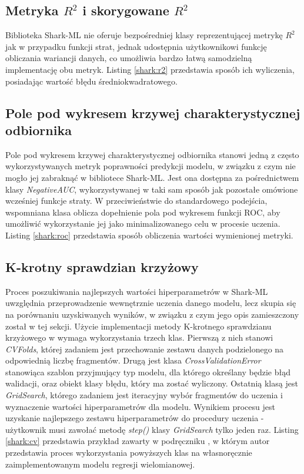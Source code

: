 \subsection{Metryka $R^2$ i skorygowane $R^2$}

Biblioteka Shark-ML nie oferuje bezpośredniej klasy reprezentującej metrykę $R^2$ jak w przypadku funkcji strat, jednak udostępnia użytkownikowi funkcję obliczania wariancji danych, co umożliwia bardzo łatwą samodzielną implementację obu metryk. Listing \ref{shark:r2} przedstawia sposób ich wyliczenia, posiadając wartość błędu średniokwadratowego.


\subsection{Pole pod wykresem krzywej charakterystycznej odbiornika}

Pole pod wykresem krzywej charakterystycznej odbiornika stanowi jedną z często wykorzystywanych metryk poprawności predykcji modelu, w związku z czym nie mogło jej zabraknąć w bibliotece Shark-ML. Jest ona dostępna za pośrednictwem klasy \textit{NegativeAUC}, wykorzystywanej w taki sam sposób jak pozostałe omówione wcześniej funkcje straty. W przeciwieństwie do standardowego podejścia, wspomniana klasa oblicza dopełnienie pola pod wykresem funkcji ROC, aby umożliwić wykorzystanie jej jako minimalizowanego celu w procesie uczenia. Listing \ref{shark:roc} przedstawia sposób obliczenia wartości wymienionej metryki.


\subsection{K-krotny sprawdzian krzyżowy}

Proces poszukiwania najlepszych wartości hiperparametrów w Shark-ML uwzględnia przeprowadzenie wewnętrznie uczenia danego modelu, lecz skupia się na porównaniu uzyskiwanych wyników, w związku z czym jego opis zamieszczony został w tej sekcji. Użycie implementacji metody K-krotnego sprawdzianu krzyżowego w wymaga wykorzystania trzech klas. Pierwszą z nich stanowi \textit{CVFolds}, której zadaniem jest przechowanie zestawu danych podzielonego na odpowiednią liczbę fragmentów. Drugą jest klasa \textit{CrossValidationError} stanowiąca szablon przyjmujący typ modelu, dla którego określany będzie błąd walidacji, oraz obiekt klasy błędu, który ma zostać wyliczony. Ostatnią klasą jest \textit{GridSearch}, którego zadaniem jest iteracyjny wybór fragmentów do uczenia i wyznaczenie wartości hiperparametrów dla modelu. Wynikiem procesu jest uzyskanie najlepszego zestawu hiperparametrów do procedury uczenia - użytkownik musi zawołać metodę \textit{step()} klasy \textit{GridSearch} tylko jeden raz. Listing \ref{shark:cv} przedstawia przykład zawarty w podręczniku \cite{handsOnMachineLearning}, w którym autor przedstawia proces wykorzystania powyższych klas na własnoręcznie zaimplementowanym modelu regresji wielomianowej. 

